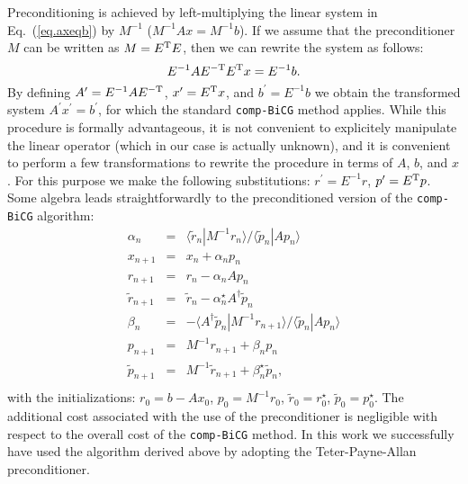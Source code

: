 \documentclass[twocolumn,prb,showpacs,superscriptaddress]{revtex4}
\def\>{\rangle}
\def\<{\langle}
\def\rt{\tilde{r}}
\def\pt{\tilde{p}}
\begin{document}
Preconditioning is achieved by left-multiplying the linear system in Eq.\ (\ref{eq.axeqb}) 
by $M^{-1}$ ($M^{-1}Ax=M^{-1}b$). If we assume that the preconditioner $M$ can be 
written as $M=E^{\rm T}E$, then we can rewrite the system as follows:
  \begin{equation}
  E^{-1}AE^{-{\rm T}} E^{\rm T}x = E^{-1}b.
  \end{equation}
By defining $A^\prime=E^{-1}AE^{-{\rm T}}$, $x^\prime=E^{\rm T}x$, and $b^\prime=E^{-1}b$
we obtain the transformed system $A^\prime x^\prime=b^\prime$, for which the
standard {\tt comp-BiCG} method applies.
While this procedure is formally advantageous, it is not convenient to explicitely
manipulate the linear operator (which in our case is actually unknown), and it is
convenient to perform a few transformations to rewrite the procedure in terms of
$A$, $b$, and $x$. For this purpose we make the following substitutions:
$r^\prime = E^{-1}r$, $p^\prime=E^{\rm T} p$. Some algebra leads straightforwardly
to the preconditioned version of the {\tt comp-BiCG} algorithm:
  \begin{eqnarray}
  \alpha_n & = & \<\rt_n|M^{-1}r_n\>/\<\pt_n|Ap_n\> \nonumber \\ \nonumber
  x_{n+1} & = & x_n + \alpha_n p_n \\ \nonumber
  r_{n+1} & = & r_n - \alpha_n Ap_n \\ \nonumber
  \rt_{n+1} & = & \rt_n - \alpha_n^\star A^\dagger \pt_n \\ \nonumber
  \beta_n & = & - \<A^\dagger\pt_n|M^{-1}r_{n+1}\>/\<\pt_n|Ap_n\> \\ \nonumber
  p_{n+1} & = & M^{-1}r_{n+1} + \beta_n p_n \\ \nonumber
  \pt_{n+1} & = & M^{-1}\rt_{n+1} + \beta_n^\star \pt_n, \\ \nonumber
  \end{eqnarray}
with the initializations: $r_0=b-Ax_0$, $p_0=M^{-1}r_0$, $\rt_0=r_0^\star$,
$\pt_0=p_0^\star$.
The additional cost associated with the use of the preconditioner is negligible
with respect to the overall cost of the {\tt comp-BiCG} method.
In this work we successfully have used the algorithm derived above by adopting the
Teter-Payne-Allan preconditioner.\cite{tpa}
\end{document}
